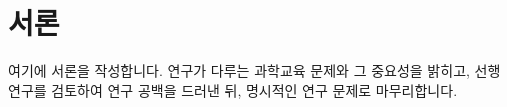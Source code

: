 \section{서론}\label{sec:introduction-kr}


여기에 서론을 작성합니다. 연구가 다루는 과학교육 문제와 그 중요성을 밝히고,
선행연구를 검토하여 연구 공백을 드러낸 뒤, 명시적인 연구 문제로 마무리합니다.

